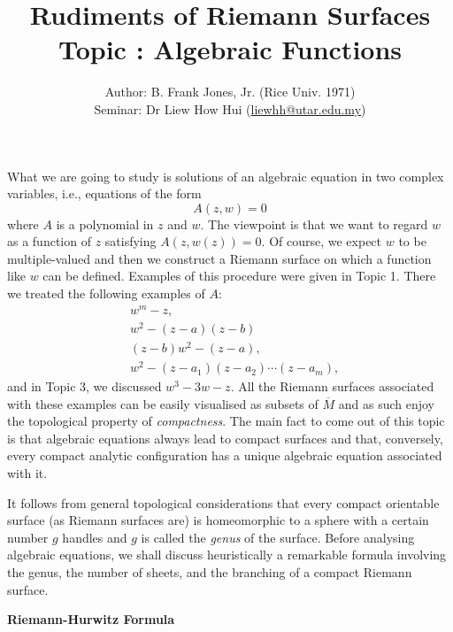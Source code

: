 \documentclass[a4paper,11pt]{article}
\newcounter{topic}
\begin{document}
\title{{\sc Rudiments of Riemann Surfaces\\
    Topic \thetopic{}: Algebraic Functions}}
\author{Author: B. Frank Jones, Jr. (Rice Univ. 1971)\\
Seminar: Dr Liew How Hui (\url{liewhh@utar.edu.my})}
\date{}

\maketitle

What we are going to study is solutions of an algebraic equation in
two complex variables, i.e., equations of the form
$$
A(z,w) = 0
$$
where $A$ is a polynomial in $z$ and $w$. The viewpoint is that we
want to regard $w$ as a function of $z$ satisfying $A(z,w(z)) = 0$.
Of course, we expect $w$ to be multiple-valued and then we construct a
Riemann surface on which a function like $w$ can be defined.  Examples
of this procedure were given in Topic 1.  There we treated the
following examples of $A$:
$$
\begin{aligned}
  &w^m - z,\\
  &w^2 - (z-a)(z-b)\\
  &(z-b)w^2 - (z-a),\\
  &w^2 - (z-a_1)(z-a_2)\cdots (z-a_m),
\end{aligned}
$$
and in Topic 3, we discussed $w^3-3w-z$.  All the Riemann surfaces
associated with these examples can be easily visualised as subsets of
$\overline{M}$ and as such enjoy the topological property of
\emph{compactness}.  The main fact 
to come out of this topic is that algebraic equations always lead to
compact surfaces and that, conversely, every compact analytic
configuration has a unique algebraic equation associated with it.

It follows from general topological considerations that every compact
orientable surface (as Riemann surfaces are) is homeomorphic to a
sphere with a certain number $g$ handles and $g$ is called the
\emph{genus} of the surface.  Before analysing algebraic equations, we
shall discuss heuristically a remarkable formula involving the genus,
the number of sheets, and the branching of a compact Riemann surface.

\begin{mdframed}
\centering
\bf Riemann-Hurwitz Formula
\end{mdframed}
\end{document}
